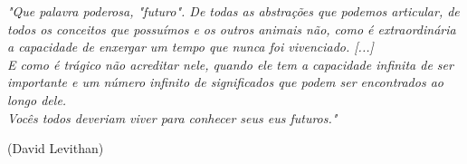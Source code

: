 \begin{epigrafe}
\begin{flushright} 
\vspace*{\fill}

    \textit{"Que palavra poderosa, "futuro". De todas as abstrações que podemos articular, de todos os conceitos que possuímos e os outros animais não, como é extraordinária a capacidade de enxergar um tempo que nunca foi vivenciado. [...] \\
    E como é trágico não acreditar nele, quando ele tem a capacidade infinita de ser importante e um número infinito de significados que podem ser encontrados ao longo dele. \\
    Vocês todos deveriam viver para conhecer seus eus futuros."}
    
    (David Levithan)

\end{flushright}
\end{epigrafe}